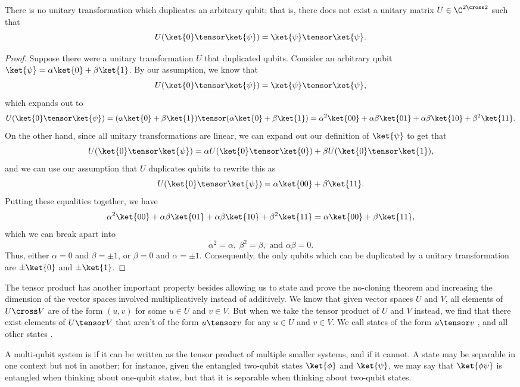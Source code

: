 \begin{theorem}
  There is no unitary transformation which duplicates an arbitrary qubit; that
  is, there does not exist a unitary matrix $U \in \C^{2 \cross 2}$ such that \[
  U(\ket{0}\tensor\ket{\psi}) = \ket{\psi}\tensor\ket{\psi}.\]
\end{theorem}
\begin{proof}
  Suppose there were a unitary transformation $U$ that duplicated qubits.
  Consider an arbitrary qubit $\ket{\psi} = \alpha\ket{0} + \beta\ket{1}$.  By
  our assumption, we know that \[ U(\ket{0} \tensor \ket{\psi}) = \ket{\psi}
  \tensor \ket{\psi},
  \] which expands out to \[
      U(\ket{0} \tensor \ket{\psi})
    = (\alpha\ket{0} + \beta\ket{1}) \tensor (\alpha\ket{0} + \beta\ket{1})
    = \alpha^2    \ket{00}
    + \alpha\beta \ket{01}
    + \alpha\beta \ket{10}
    + \beta^2     \ket{11}.
  \]  On the other hand, since all unitary transformations are linear, we can
  expand out our definition of $\ket{\psi}$ to get that \[
      U(\ket{0} \tensor \ket{\psi})
    = \alpha U(\ket{0} \tensor \ket{0}) + \beta U(\ket{0} \tensor \ket{1}),
  \] and we can use our assumption that $U$ duplicates qubits to rewrite this
  as \[
    U(\ket{0} \tensor \ket{\psi}) = \alpha \ket{00} + \beta \ket{11}.
  \]  Putting these equalities together, we have \[
      \alpha^2    \ket{00}
    + \alpha\beta \ket{01}
    + \alpha\beta \ket{10}
    + \beta^2     \ket{11}
    = \alpha \ket{00} + \beta \ket{11},
  \] which we can break apart into \[
    \alpha^2 = \alpha,\ \beta^2 = \beta,\text{ and } \alpha\beta = 0.
  \]  Thus, either $\alpha = 0$ and $\beta = \pm1$, or $\beta = 0$ and $\alpha =
  \pm1$.  Consequently, the only qubits which can be duplicated by a unitary
  transformation are $\pm\ket{0}$ and $\pm\ket{1}$.
\end{proof}

The tensor product has another important property besides allowing us to state
and prove the no-cloning theorem and increasing the dimension of the vector
spaces involved multiplicatively instead of additively.  We know that given
vector spaces $U$ and $V$, all elements of $U \cross V$ are of the form $(u,v)$
for some $u \in U$ and $v \in V$.  But when we take the tensor product of $U$
and $V$ instead, we find that there exist elements of $U \tensor V$ that aren't
of the form $u \tensor v$ for any $u \in U$ and $v \in V$.  We call states of
the form $u \tensor v$ , and all other states .

\begin{definition}%
\label{def:separable-entangled}
  A multi-qubit system is  if it can be written as the tensor
  product of multiple smaller systems, and  if it cannot.  A
  state may be separable in one context but not in another; for instance, given
  the entangled two-qubit states $\ket{\phi}$ and $\ket{\psi}$, we may say that
  $\ket{\phi\psi}$ is entangled when thinking about one-qubit states, but that
  it is separable when thinking about two-qubit states.
\end{definition}

